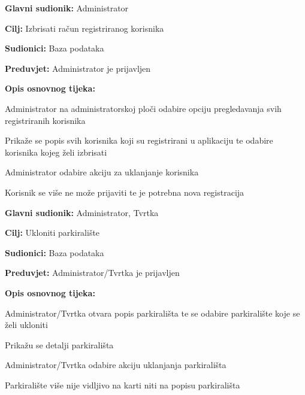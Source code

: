 \noindent {}
\begin{packed_item}
	
	\item \textbf{Glavni sudionik:} Administrator
	\item  \textbf{Cilj:} Izbrisati račun registriranog korisnika
	\item  \textbf{Sudionici:} Baza podataka
	\item  \textbf{Preduvjet:} Administrator je prijavljen
	\item  \textbf{Opis osnovnog tijeka:}
	
	\item[] \begin{packed_enum}
		
		\item Administrator na administratorskoj ploči odabire opciju pregledavanja svih registriranih korisnika 
		\item Prikaže se popis svih korisnika koji su registrirani u aplikaciju te odabire korisnika kojeg želi izbrisati
		\item Administrator odabire akciju za uklanjanje korisnika
		\item Korisnik se više ne može prijaviti te je potrebna nova registracija

	\end{packed_enum}
\end{packed_item}

\noindent {}
\begin{packed_item}
	
	\item \textbf{Glavni sudionik:} Administrator, Tvrtka
	\item \textbf{Cilj:} Ukloniti parkiralište
	\item \textbf{Sudionici:} Baza podataka
	\item \textbf{Preduvjet:} Administrator/Tvrtka je prijavljen
	\item \textbf{Opis osnovnog tijeka:}
	
	\item[] \begin{packed_enum}
		
		\item Administrator/Tvrtka otvara popis parkirališta te se odabire parkiralište koje se želi ukloniti
		\item Prikažu se detalji parkirališta
		\item Administrator/Tvrtka odabire akciju uklanjanja parkirališta
		\item Parkiralište više nije vidljivo na karti niti na popisu parkirališta

	\end{packed_enum}
\end{packed_item}

